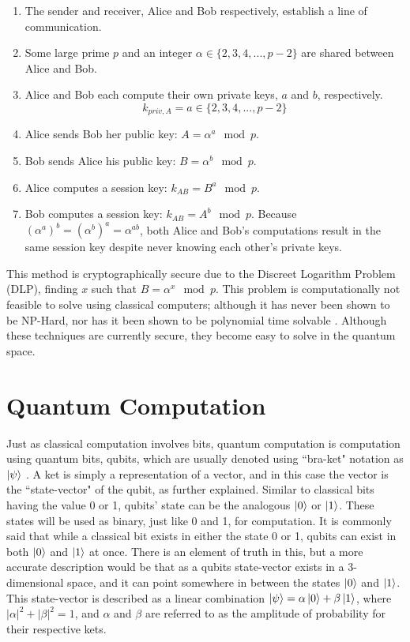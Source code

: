 \begin{enumerate}
\item The sender and receiver, Alice and Bob respectively, establish a line of communication.
\item Some large prime $p$ and an integer $\alpha \in \{2,3,4,...,p-2\}$ are shared between Alice and Bob.
\item Alice and Bob each compute their own private keys, $a$ and $b$, respectively. $$k_{priv,A} = a \in \{2,3,4,...,p-2\}$$
\item Alice sends Bob her public key: $A = \alpha^a \mod p$.
\item Bob sends Alice his public key: $B = \alpha^b \mod p$. 
\item Alice computes a session key: $k_{AB} = B^a \mod p$.
\item Bob computes a session key: $k_{AB} = A^b \mod p$. 
Because $(\alpha^a)^b = (\alpha^b)^a = \alpha^{ab}$, both Alice and Bob's computations result in the same session key despite never knowing each other's private keys. 
\end{enumerate}

This method is cryptographically secure due to the Discreet Logarithm Problem (DLP), finding $x$ such that $B = \alpha^x \mod p$. 
This problem is computationally not feasible to solve using classical computers; although it has never been shown to be NP-Hard, nor has it been shown to be polynomial time solvable \cite{Shor_1997}.
Although these techniques are currently secure, they become easy to solve in the quantum space.

\section{Quantum Computation}

Just as classical computation involves bits, quantum computation is computation using quantum bits, qubits, which are usually denoted using ``bra-ket" notation as $\ket{\psi}$ \cite{qc:agi}.
A ket is simply a representation of a vector, and in this case the vector is the ``state-vector" of the qubit, as further explained.
Similar to classical bits having the value 0 or 1, qubits' state can be the analogous $\ket{0}$ or $\ket{1}$.
These states will be used as binary, just like 0 and 1, for computation.
It is commonly said that while a classical bit exists in either the state 0 or 1, qubits can exist in both $\ket{0}$ and $\ket{1}$ at once.
There is an element of truth in this, but a more accurate description would be that as a qubits state-vector exists in a 3-dimensional space, and it can point somewhere in between the states $\ket{0}$ and $\ket{1}$. 
This state-vector is described as a linear combination $\ket{\psi} = \alpha\ket{0} + \beta\ket{1}$, where $|\alpha|^2 + |\beta|^2 = 1$, and $\alpha$ and $\beta$ are referred to as the amplitude of probability for their respective kets.

